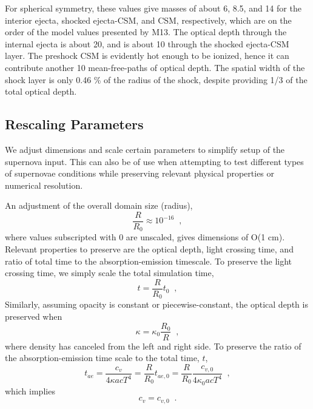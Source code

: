 \documentclass[]{article}
\begin{document}
		For spherical symmetry, these values give masses of about 6, 8.5, and 14 for the interior ejecta, shocked ejecta-CSM, and CSM, respectively, which are on the order of the model values presented by M13. The optical depth through the internal ejecta is about 20, and is about 10 through the shocked ejecta-CSM layer. The preshock CSM is evidently hot enough to be ionized, hence it can contribute another 10 mean-free-paths of optical depth. The spatial width of the shock layer is only 0.46 \% of the radius of the shock, despite providing 1/3 of the total optical depth.

	\subsection{Rescaling Parameters} \label{sec:rescaling}
		We adjust dimensions and scale certain parameters to simplify setup of the supernova input. This can also be of use when attempting to test different types of supernovae conditions while preserving relevant physical properties or numerical resolution.

		An adjustment of the overall domain size (radius),
		\begin{equation}
			\frac{R}{R_0} \approx 10^{-16} \;\;,
		\end{equation}
		where values subscripted with $0$ are unscaled, gives dimensions of O(1 cm). Relevant properties to preserve are the optical depth, light crossing time, and ratio of total time to the absorption-emission timescale. To preserve the light crossing time, we simply scale the total simulation time,
		\begin{equation}
			t = \frac{R}{R_0}t_0 \;\;,
		\end{equation}
		Similarly, assuming opacity is constant or piecewise-constant, the optical depth is preserved when
		\begin{equation}
			\kappa = \kappa_0\frac{R_0}{R} \;\;,
		\end{equation}
		where density has canceled from the left and right side. To preserve the ratio of the absorption-emission time scale to the total time, $t$,
		\begin{equation}
			t_{ae} = \frac{c_v}{4\kappa acT^4} = \frac{R}{R_0}t_{ae,0}
			= \frac{R}{R_0}\frac{c_{v,0}}{4\kappa_0 acT^4} \;\;,
		\end{equation}
		which implies
		\begin{equation}
			c_v = c_{v,0} \;\;.
		\end{equation}
\end{document}
